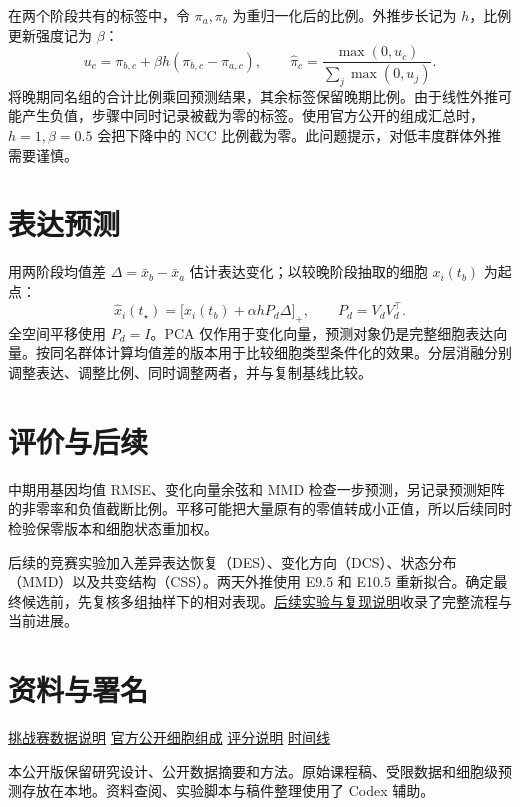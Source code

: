 \documentclass[UTF8,zihao=-4,fontset=none,a4paper]{ctexart}
\newcommand{\paperlink}[2]{\href{https://github.com/ManchesterCityWhy/Statistical_Learning_Term_Project/blob/main/#1}{#2}}
\begin{document}
在两个阶段共有的标签中，令 $\pi_a,\pi_b$ 为重归一化后的比例。外推步长记为 $h$，比例更新强度记为 $\beta$：
\[
u_c=\pi_{b,c}+\beta h(\pi_{b,c}-\pi_{a,c}),\qquad
\widehat{\pi}_c=\frac{\max(0,u_c)}{\sum_j \max(0,u_j)} .
\]
将晚期同名组的合计比例乘回预测结果，其余标签保留晚期比例。由于线性外推可能产生负值，步骤中同时记录被截为零的标签。使用官方公开的组成汇总时，$h=1,\beta=0.5$ 会把下降中的 NCC 比例截为零。此问题提示，对低丰度群体外推需要谨慎。

\section*{表达预测}

用两阶段均值差 $\Delta=\bar{x}_b-\bar{x}_a$ 估计表达变化；以较晚阶段抽取的细胞 $x_i(t_b)$ 为起点：
\[
\widehat{x}_i(t_\star) =
\big[x_i(t_b)+\alpha h P_d\Delta\big]_+,
\qquad P_d=V_d V_d^\top .
\]
全空间平移使用 $P_d=I$。PCA 仅作用于变化向量，预测对象仍是完整细胞表达向量。按同名群体计算均值差的版本用于比较细胞类型条件化的效果。分层消融分别调整表达、调整比例、同时调整两者，并与复制基线比较。

\section*{评价与后续}

中期用基因均值 RMSE、变化向量余弦和 MMD 检查一步预测，另记录预测矩阵的非零率和负值截断比例。平移可能把大量原有的零值转成小正值，所以后续同时检验保零版本和细胞状态重加权。

后续的竞赛实验加入差异表达恢复（DES）、变化方向（DCS）、状态分布（MMD）以及共变结构（CSS）。两天外推使用 E9.5 和 E10.5 重新拟合。确定最终候选前，先复核多组抽样下的相对表现。\paperlink{experiments/README.md}{后续实验与复现说明}收录了完整流程与当前进展。

\section*{资料与署名}

\small
\noindent
\href{https://virtualembryo.ai/challenge/data}{挑战赛数据说明}
\quad\href{https://virtualembryo.ai/challenge/panels/t1_composition.json}{官方公开细胞组成}
\quad\href{https://virtualembryo.ai/challenge/evaluation?section=scoring\&task=1}{评分说明}
\quad\href{https://virtualembryo.ai/challenge/timeline}{时间线}

\noindent 本公开版保留研究设计、公开数据摘要和方法。原始课程稿、受限数据和细胞级预测存放在本地。资料查阅、实验脚本与稿件整理使用了 Codex 辅助。
\end{document}
